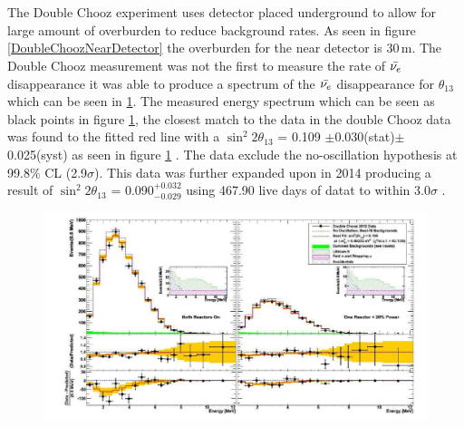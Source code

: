 \\\\The Double Chooz experiment uses detector placed underground to allow for large amount of overburden to reduce background rates. As seen in figure \ref{DoubleChoozNearDetector} the overburden for the near detector is 30\,m\cite{lasserre2006}. The Double Chooz measurement  was not the first to measure the rate of $\Bar{\nu_e}$ disappearance \cite{reno_may_2012} it was able to produce a spectrum of the $\Bar{\nu_e}$ disappearance for $\theta_{13}$ which can be seen in \ref{doubleChoozSpectrumNoCaption}. The measured energy spectrum which can be seen as black points in figure \ref{doubleChoozSpectrumNoCaption}, the closest match to the data in the double Chooz data was found to the fitted red line with a $\sin^2{2\theta_{13}}$ = 0.109 $\pm$0.030(stat)$\pm$0.025(syst) as seen in figure \ref{doubleChoozSpectrumNoCaption} \cite{Abe_2012}. The data exclude the no-oscillation hypothesis at 99.8$\%$ CL (2.9$\sigma$)\cite{Abe_2012}. This data was further expanded upon in 2014 producing a result of $\sin^2{2\theta_{13}}$ = 0.090$^{+0.032}_{-0.029}$ using 467.90 live days of datat to within $3.0\sigma$ \cite{abe2014improved}.
\begin{figure}[htbp]
 \centering
 \includegraphics[width=\linewidth]{Chapter2/Figs/Raster/doubleChoozSpectrumNoCaption.png} %
 \label{doubleChoozSpectrumNoCaption}
\end{figure}
